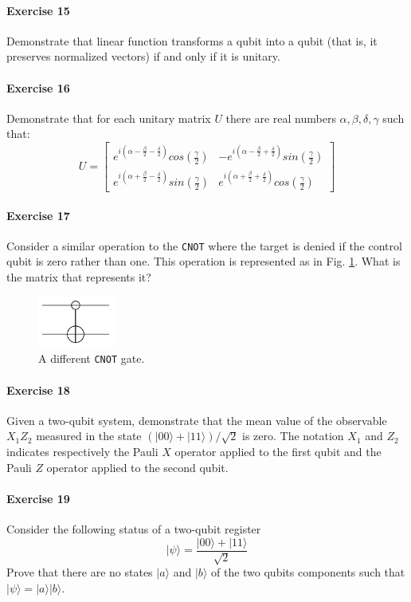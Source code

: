 \documentclass[a4paper,10pt]{article}
\begin{document}
\paragraph{Exercise 15}
\label{ex15q}
Demonstrate that linear function transforms a qubit into a qubit (that is, it preserves normalized vectors) if and only if it is unitary.
\paragraph{Exercise 16}
\label{ex16q}
Demonstrate that for each unitary matrix $U$ there are real numbers $\alpha, \beta, \delta, \gamma$ such that:
$$U = \begin{bmatrix}
e^{i(\alpha - \frac{\beta}{2} - \frac{\delta}{2})}cos(\frac{\gamma}{2}) & -e^{i(\alpha - \frac{\beta}{2} + \frac{\delta}{2})}sin(\frac{\gamma}{2}) \\
e^{i(\alpha + \frac{\beta}{2} - \frac{\delta}{2})}sin(\frac{\gamma}{2}) & e^{i(\alpha + \frac{\beta}{2} + \frac{\delta}{2})}cos(\frac{\gamma}{2})
\end{bmatrix}$$
\paragraph{Exercise 17}
\label{ex17q}
Consider a similar operation to the \texttt{CNOT} where the target is denied if the control qubit is zero rather than one. This operation is represented as in Fig. \ref{cnotvar}. What is the matrix that represents it?
\begin{figure}[!htb]
\begin{center}
\includegraphics[width=1.0in]{images/cnotvar.png}
\caption{A different \texttt{CNOT} gate.}
\label{cnotvar}
\end{center}
\end{figure}
\paragraph{Exercise 18}
\label{ex18q}
Given a two-qubit system, demonstrate that the mean value of the observable $X_1Z_2$ measured in the state $(|00\rangle + |11\rangle)/\sqrt{2}$ is zero. The notation $X_1$ and $Z_2$ indicates respectively the Pauli $X$ operator applied to the first qubit and the Pauli $Z$ operator applied to the second qubit. 
\paragraph{Exercise 19}
\label{ex19q}
Consider the following status of a two-qubit register
$$|\psi\rangle = \frac{|00\rangle + |11\rangle}{\sqrt{2}}$$
Prove that there are no states $|a\rangle$ and $|b\rangle$ of the two qubits components such that $|\psi\rangle = |a\rangle|b\rangle$. 
\end{document}
